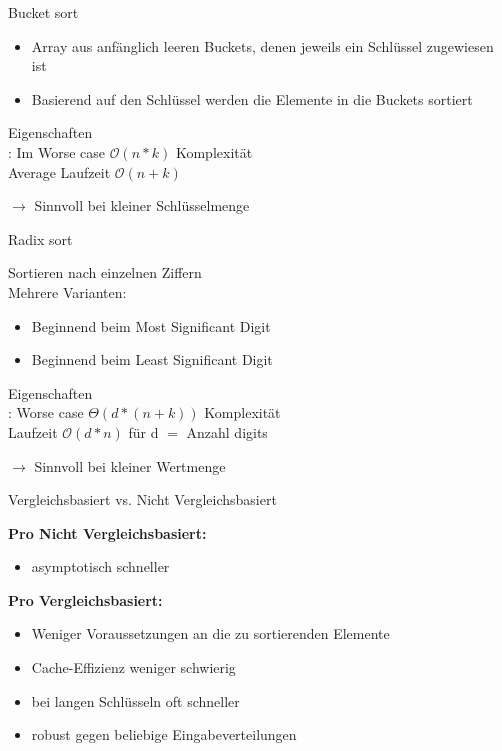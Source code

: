 \begin{frame}{Bucket sort}
	\begin{itemize}
		\item Array aus anfänglich leeren Buckets, denen jeweils ein Schlüssel zugewiesen ist
		\item Basierend auf den Schlüssel werden die Elemente in die Buckets sortiert
	\end{itemize}
	
	\begin{block}{Eigenschaften}
		{\color{english}{stabil}} \\
		{\color{red}{Nicht inplace}}: Im Worse case $\mathcal{O}(n * k)$ Komplexität\\
		Average Laufzeit $\mathcal{O}(n+k)$
	\end{block}
	
	
	$\rightarrow$ Sinnvoll bei kleiner Schlüsselmenge

\end{frame}

\begin{frame}{Radix sort}

	Sortieren nach einzelnen Ziffern \\
	Mehrere Varianten:
	\begin{itemize}
		\item Beginnend beim Most Significant Digit
		\item Beginnend beim Least Significant Digit
	\end{itemize}
	
	\begin{block}{Eigenschaften}
		{\color{english}{stabil}}\\
		{\color{red}{Nicht inplace}}: Worse case $\Theta(d * (n + k))$ Komplexität\\
		Laufzeit $\mathcal{O}(d * n)$ für d $=$ Anzahl digits
	\end{block}
	
	
	$\rightarrow$ Sinnvoll bei kleiner Wertmenge

\end{frame}

\begin{frame}{Vergleichsbasiert vs. Nicht Vergleichsbasiert}
	
	{\textbf{\large{Pro Nicht Vergleichsbasiert:}}}
	\begin{itemize}
		\item asymptotisch schneller
	\end{itemize}

	
	{\textbf{\large{Pro Vergleichsbasiert:}}} \\
	\begin{itemize}
		\item Weniger Voraussetzungen an die zu sortierenden Elemente
		\item Cache-Effizienz weniger schwierig
		\item bei langen Schlüsseln oft schneller
		\item robust gegen beliebige Eingabeverteilungen
	\end{itemize}

\end{frame}



